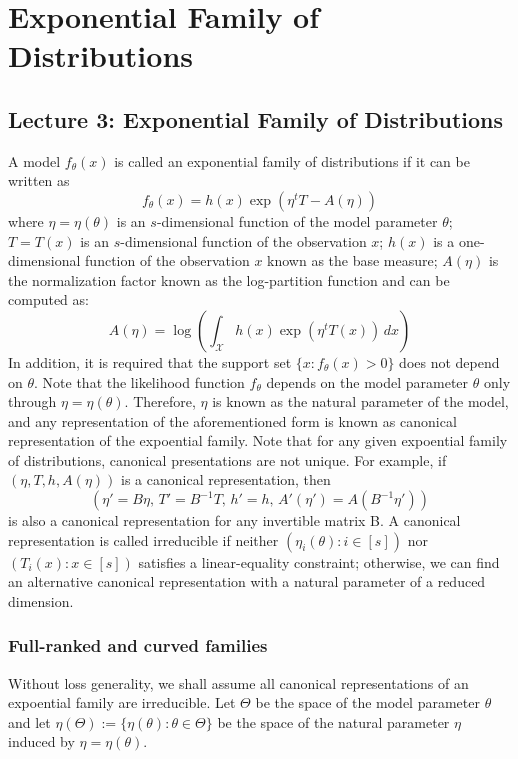 \chapter{Exponential Family of Distributions}

\section{Lecture 3: Exponential Family of Distributions}
A model $f_\theta(x)$ is called an exponential family of distributions if it can be written as
\[
    f_\theta(x) = h(x) \exp (\eta^t T - A(\eta))
\]
where $\eta = \eta(\theta)$ is an $s$-dimensional function of the model parameter $\theta$; $T=T(x)$ is an $s$-dimensional function of the observation $x$; $h(x)$ is a one-dimensional function of the observation $x$ known as the base measure; $A(\eta)$ is the normalization factor known as the log-partition function and can be computed as:
\[
    A(\eta) = \log \left( \int_{\mathcal{X}} h(x) \exp (\eta^t T(x)) \, dx \right)
\]
In addition, it is required that the support set $\{x : f_\theta(x) > 0 \}$ does not depend on $\theta$. Note that the likelihood function $f_\theta$ depends on the model parameter $\theta$ only through $\eta = \eta(\theta)$. Therefore, $\eta$ is known as the natural parameter of the model, and any representation of the aforementioned form is known as canonical representation of the expoential family. Note that for any given expoential family of distributions, canonical presentations are not unique. For example, if $(\eta, T, h, A(\eta))$ is a canonical representation, then
\[
    (\eta' = B\eta, \, T' = B^{-1}T, \, h'=h, \, A'(\eta') = A(B^{-1} \eta'))
\]
is also a canonical representation for any invertible matrix B. A canonical representation is called irreducible if neither $(\eta_i(\theta) : i \in [s])$ nor $(T_i(x) : x \in [s])$ satisfies a linear-equality constraint; otherwise, we can find an alternative canonical representation with a natural parameter of a reduced dimension.

\subsection{Full-ranked and curved families}
Without loss generality, we shall assume all canonical representations of an expoential family are irreducible. Let $\Theta$ be the space of the model parameter $\theta$ and let $\eta(\Theta) := \{\eta(\theta) : \theta \in \Theta\}$ be the space of the natural parameter $\eta$ induced by $\eta = \eta(\theta)$.

